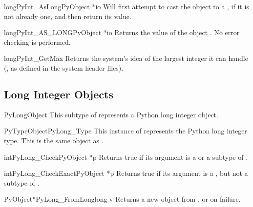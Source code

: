 \begin{cfuncdesc}{long}{PyInt_AsLong}{PyObject *io}
  Will first attempt to cast the object to a , if
  it is not already one, and then return its value.
\end{cfuncdesc}

\begin{cfuncdesc}{long}{PyInt_AS_LONG}{PyObject *io}
  Returns the value of the object .  No error checking is
  performed.
\end{cfuncdesc}

\begin{cfuncdesc}{long}{PyInt_GetMax}{}
  Returns the system's idea of the largest integer it can handle
  (, as defined in the system
  header files).
\end{cfuncdesc}


\subsection{Long Integer Objects \label{longObjects}}

\begin{ctypedesc}{PyLongObject}
  This subtype of  represents a Python long integer
  object.
\end{ctypedesc}

\begin{cvardesc}{PyTypeObject}{PyLong_Type}
  This instance of  represents the Python long
  integer type.  This is the same object as .
\end{cvardesc}

\begin{cfuncdesc}{int}{PyLong_Check}{PyObject *p}
  Returns true if its argument is a  or a subtype
  of .
\end{cfuncdesc}

\begin{cfuncdesc}{int}{PyLong_CheckExact}{PyObject *p}
  Returns true if its argument is a , but not a
  subtype of .
\end{cfuncdesc}

\begin{cfuncdesc}{PyObject*}{PyLong_FromLong}{long v}
  Returns a new  object from , or \NULL{}
  on failure.
\end{cfuncdesc}

